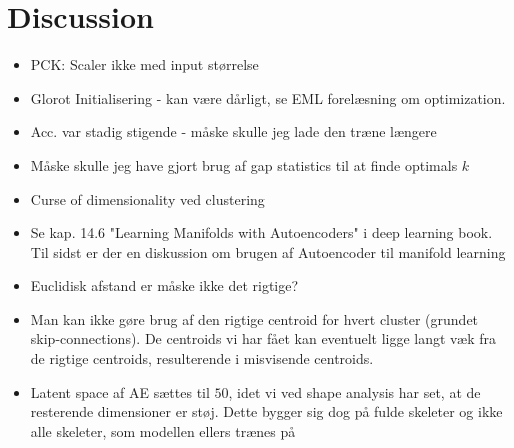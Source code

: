 \documentclass[./main.tex]{subfiles}
\begin{document}
\section{Discussion}\label{sec:discussion}
\begin{itemize}
    \item PCK: Scaler ikke med input størrelse
    \item Glorot Initialisering - kan være dårligt, se EML forelæsning om optimization.
    \item Acc. var stadig stigende - måske skulle jeg lade den træne længere
    \item Måske skulle jeg have gjort brug af gap statistics til at finde optimals $k$
    \item Curse of dimensionality ved clustering
    \item Se kap. 14.6 "Learning Manifolds with Autoencoders" i deep learning book. Til sidst er der en diskussion om brugen af Autoencoder til manifold learning
    \item Euclidisk afstand er måske ikke det rigtige?
    \item Man kan ikke gøre brug af den rigtige centroid for hvert cluster (grundet skip-connections). De centroids vi har fået kan eventuelt ligge langt væk fra de rigtige centroids, resulterende i misvisende centroids.
    \item Latent space af AE sættes til $50$, idet vi ved shape analysis har set, at de resterende dimensioner er støj. Dette bygger sig dog på fulde skeleter og ikke alle skeleter, som modellen ellers trænes på
\end{itemize}
\end{document}
